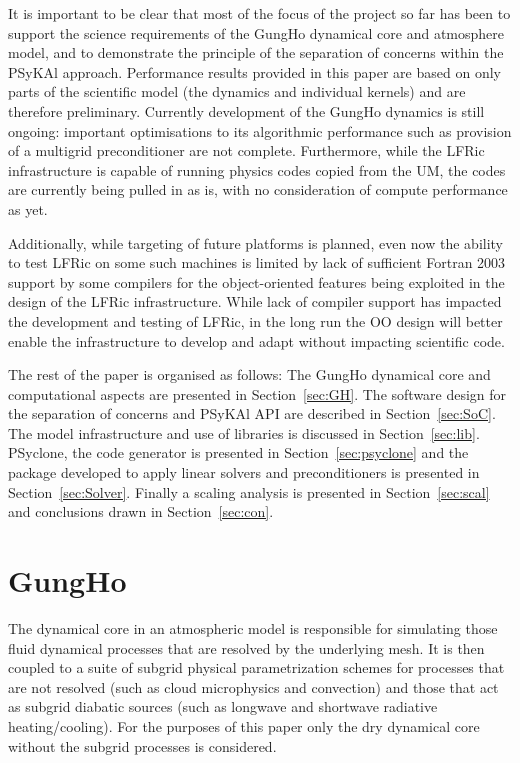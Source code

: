 \documentclass[review,times]{elsarticle}
\begin{document}
It is important to be clear that most of the focus of the project so
far has been to support the science requirements of the GungHo
dynamical core and atmosphere model, and to demonstrate the principle
of the separation of concerns within the PSyKAl approach. Performance
results provided in this paper are based on only parts of the
scientific model (the dynamics and individual kernels) and are
therefore preliminary. Currently development of the GungHo dynamics is
still ongoing: important optimisations to its algorithmic performance
such as provision of a multigrid preconditioner are not
complete. Furthermore, while the LFRic infrastructure is capable of
running physics codes copied from the UM, the codes are currently
being pulled in as is, with no consideration of compute performance as
yet.

Additionally, while targeting of future platforms is planned, even now
the ability to test LFRic on some such machines is limited by lack of
sufficient Fortran 2003 support by some compilers for the
object-oriented features being exploited in the design of the LFRic
infrastructure. While lack of compiler support has impacted the
development and testing of LFRic, in the long run the OO design will
better enable the infrastructure to develop and adapt without
impacting scientific code.

The rest of the paper is organised as follows: The GungHo dynamical
core and computational aspects are presented in
Section~\ref{sec:GH}. The software design for the separation of
concerns and PSyKAl API are described in Section~\ref{sec:SoC}. The
model infrastructure and use of libraries is discussed in
Section~\ref{sec:lib}. PSyclone, the code generator is presented in
Section~\ref{sec:psyclone} and the package developed to apply linear
solvers and preconditioners is presented in Section~\ref{sec:Solver}.
Finally a scaling analysis is presented in Section~\ref{sec:scal} and
conclusions drawn in Section~\ref{sec:con}.

\section{\label{sec:GH}GungHo}

The dynamical core in an atmospheric model is responsible for
simulating those fluid dynamical processes that are resolved by the
underlying mesh. It is then coupled to a suite of subgrid physical
parametrization schemes for processes that are not resolved (such as
cloud microphysics and convection) and those that act as subgrid
diabatic sources (such as longwave and shortwave radiative
heating/cooling). For the purposes of this paper only the dry
dynamical core without the subgrid processes is considered.
\end{document}

